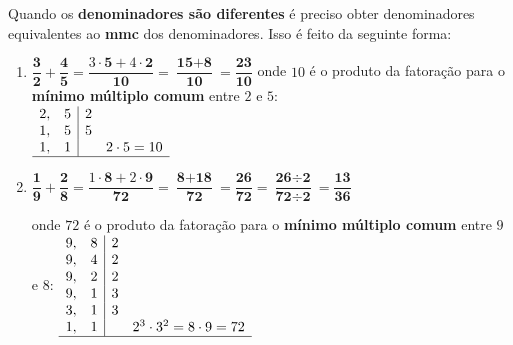 	\noindent Quando os \textbf{denominadores são diferentes} é preciso obter denominadores equivalentes ao \textbf{mmc} dos denominadores. Isso é feito da seguinte forma:
	\begin{enumerate}[label=\alph*)]
		\item $\dfrac{\textbf{3}}{\textbf{2}} + \dfrac{\textbf{4}}{\textbf{5}} = \dfrac{3\cdot\textbf{5} + 4\cdot\textbf{2}}{\textbf{10}} = \dfrac{\textbf{15} + \textbf{8}}{\textbf{10}} = \dfrac{\textbf{23}}{\textbf{10}}$ onde $10$ é o produto da fatoração para o \\
		
		\textbf{mínimo múltiplo comum} entre $2$ e $5$:\\		
		$\begin{array}{cc|cc}
			2, & 5 & 2 & \\ 
			1, & 5 & 5 & \\ 
			1, & 1 &  & 2 \cdot 5 = 10 \\
			\hline  
		\end{array}$ \\ \newline
		
			\item $\dfrac{\textbf{1}}{\textbf{9}} + \dfrac{\textbf{2}}{\textbf{8}} = \dfrac{1\cdot\textbf{8} + 2\cdot\textbf{9}}{\textbf{72}} = \dfrac{\textbf{8} + \textbf{18}}{\textbf{72}} = \dfrac{\textbf{26}}{\textbf{72}} = \dfrac{\textbf{26}\div\textbf{2}}{\textbf{72}\div\textbf{2}} = \dfrac{\textbf{13}}{\textbf{36}}$
			
			onde $72$ é o produto da fatoração para o \textbf{mínimo múltiplo comum} entre $9$ e $8$:			
		$\begin{array}{cc|cc}
		9, & 8 & 2 & \\ 
		9, & 4 & 2 & \\
		9, & 2 & 2 & \\
		9, & 1 & 3 & \\
		3, & 1 & 3 & \\
		1, & 1 &  & 2^{3} \cdot 3^{2} = 8 \cdot 9 = 72 \\
		\hline
		\end{array}$
	\end{enumerate}
	

